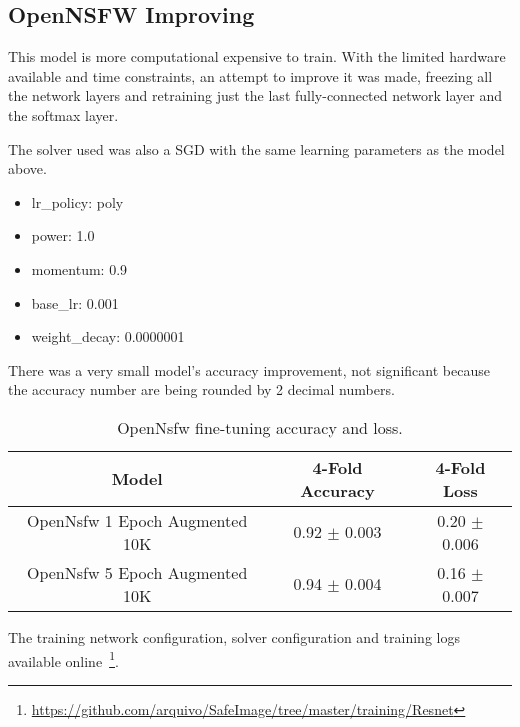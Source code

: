 \subsection{OpenNSFW Improving}

This model is more computational expensive to train. With the limited hardware available and time constraints, an attempt to improve it was made, freezing all the network layers and retraining just the last fully-connected network layer and the softmax layer.

The solver used was also a SGD with the same learning parameters as the model above.
\begin{itemize}
\item lr\_policy: poly
\item power: 1.0
\item momentum: 0.9
\item base\_lr: 0.001
\item weight\_decay: 0.0000001
\end{itemize}

There was a very small model's accuracy improvement, not significant because the accuracy number are being rounded by 2 decimal numbers.


\begin{table}[]
\centering
\caption{OpenNsfw fine-tuning accuracy and loss.}
\label{tbl:finetune_resnet}
\begin{tabular}{|c|c|c|}
\hline
Model                                                	& 4-Fold Accuracy  	& 4-Fold Loss   	\\ \hline
OpenNsfw 1 Epoch Augmented 10K							& 0.92 $\pm$ 0.003	& 0.20 $\pm$ 0.006 	\\ \hline
OpenNsfw 5 Epoch Augmented 10K 						& 0.94 $\pm$ 0.004	& 0.16 $\pm$ 0.007 	\\ \hline
\end{tabular}
\end{table}

The training network configuration, solver configuration and training logs available online~\footnote{\url{https://github.com/arquivo/SafeImage/tree/master/training/Resnet}}.

\iffalse
